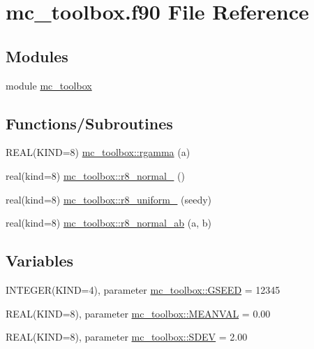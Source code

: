 \hypertarget{mc__toolbox_8f90}{
\section{mc\_\-toolbox.f90 File Reference}
\label{mc__toolbox_8f90}
}
\subsection*{Modules}
\begin{DoxyCompactItemize}
\item 
module \hyperlink{namespacemc__toolbox}{mc\_\-toolbox}
\end{DoxyCompactItemize}
\subsection*{Functions/Subroutines}
\begin{DoxyCompactItemize}
\item 
REAL(KIND=8) \hyperlink{namespacemc__toolbox_acedafdf57f1c1cd3610359fe837a708d}{mc\_\-toolbox::rgamma} (a)
\item 
real(kind=8) \hyperlink{namespacemc__toolbox_ab8fa538b6e1b30d65864f793e75425ea}{mc\_\-toolbox::r8\_\-normal\_} ()
\item 
real(kind=8) \hyperlink{namespacemc__toolbox_a405cb2a6c8bceb2f89fc0da987cd399a}{mc\_\-toolbox::r8\_\-uniform\_} (seedy)
\item 
real(kind=8) \hyperlink{namespacemc__toolbox_aab33e2e1a35352d1550e81fb86fb1cc9}{mc\_\-toolbox::r8\_\-normal\_\-ab} (a, b)
\end{DoxyCompactItemize}
\subsection*{Variables}
\begin{DoxyCompactItemize}
\item 
INTEGER(KIND=4), parameter \hyperlink{namespacemc__toolbox_a2b3c4edff260f415453579697b0a5282}{mc\_\-toolbox::GSEED} = 12345
\item 
REAL(KIND=8), parameter \hyperlink{namespacemc__toolbox_a9e72a666484c36244e37a8083e792dd8}{mc\_\-toolbox::MEANVAL} = 0.00
\item 
REAL(KIND=8), parameter \hyperlink{namespacemc__toolbox_a5655149a57d9d21f98b7515536fe1a1b}{mc\_\-toolbox::SDEV} = 2.00
\end{DoxyCompactItemize}
